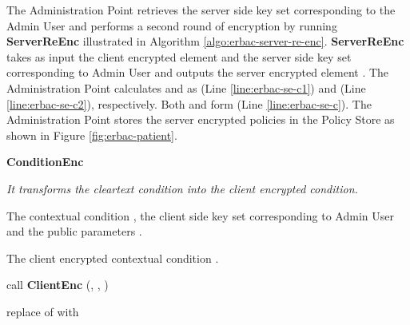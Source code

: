 \documentclass[epsfig,a4paper,11pt,titlepage]{book}
\numberwithin{algorithm}{chapter}
\newcommand{\algofontsize}{\fontsize{11}{12}\selectfont}
\begin{document}
The Administration Point retrieves the server side key set corresponding to the Admin User and performs a second round of encryption by running \textbf{ServerReEnc} illustrated in Algorithm \ref{algo:erbac-server-re-enc}. \textbf{ServerReEnc} takes as input the client encrypted element  and the server side key set  corresponding to Admin User  and outputs the server encrypted element . The Administration Point calculates  and  as  (Line \ref{line:erbac-se-c1}) and  (Line \ref{line:erbac-se-c2}), respectively. Both  and  form  (Line \ref{line:erbac-se-c}). The Administration Point stores the server encrypted policies in the Policy Store as shown in Figure \ref{fig:erbac-patient}.





\begin{algorithm} [htp]
{\algofontsize
\caption{\textbf{ConditionEnc}}

\label{algo:erbac-deploy-contextual-condition-client-side}

\begin{algorithmic}[1]

\INPUT \emph{It transforms the cleartext condition into the client encrypted condition.}

\Require The contextual condition , the client side key set  corresponding to Admin User  and the public parameters .

\Ensure The client encrypted contextual condition .

\medskip

\State  \label{line:erbac-deploy-cc-cs-copy}

 \label{line:erbac-deploy-cc-cs-loop}

	\State  call \textbf{ClientEnc} (, , ) \label{line:erbac-deploy-cc-cs-call}
	
	\State replace  of  with  \label{line:erbac-deploy-cc-cs-replace}

\EndFor

\Return 

\end{algorithmic}
}
\end{algorithm}
\end{document}
